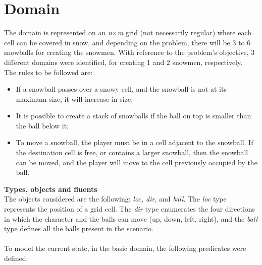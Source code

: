 \documentclass{article}
\begin{document}
\section*{Domain}
The domain is represented on an \textit{n$\times$m} grid (not necessarily regular) where each 
cell can be covered in snow, and depending on the problem, there will be 3 to 6 snowballs for creating the snowmen.
With reference to the problem's objective, 3 different domains were identified, for creating 
1 and 2 snowmen, respectively.\\ 
The rules to be followed are:
\begin{itemize}
    \item If a snowball passes over a snowy cell, and the snowball is not at its maximum size, it will increase in size;
\item It is possible to create a stack of snowballs if the ball on top is smaller than the ball below it;
\item To move a snowball, the player must be in a cell adjacent to the snowball.
If the destination cell is free, 
    or contains a larger snowball, then the snowball can be moved, and the player will move to the cell previously 
    occupied by the ball.
\end{itemize}
\textbf{Types, objects and fluents}\\
The objects considered are the following: \textit{loc, dir}, and \textit{ball}.
The \textit{loc} type represents the position of a grid cell.
The \textit{dir} type enumerates the four directions in which the character and the balls can move (up, down, left, right), and the \textit{ball} type defines all the balls present in the scenario.
\\ \\
To model the current state, in the basic domain, the following predicates were defined:
\end{document}
